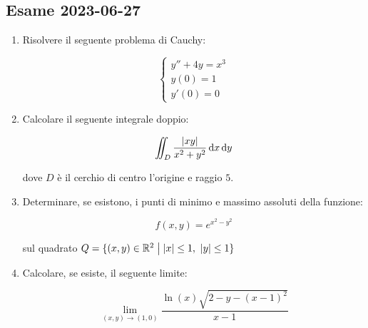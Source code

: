 \subsection{Esame 2023{-}06{-}27}

\begin{enumerate}
    \itemsep32pt
    \item Risolvere il seguente problema di Cauchy:

          \begin{equation*}
              \begin{cases}
                  y'' + 4y = x^3 \\
                  y(0) = 1       \\
                  y'(0) = 0
              \end{cases}
          \end{equation*}

    \item Calcolare il seguente integrale doppio:

          \[
              \iint_{D} \frac{|xy|}{x^2 + y^2} \mathop{}\!\mathrm{d}{x}\mathop{}\!\mathrm{d}{y}
          \]

          dove \(D\) è il cerchio di centro l'origine e raggio \(5\).

    \item Determinare, se esistono, i punti di minimo e massimo assoluti della funzione:

          \[
              f(x,y) = e^{x^2-y^2}
          \]

          sul quadrato \(Q = \{ (x,y) \in \mathbb{R}^2 \;\big|\; |x| \le 1,\ |y| \le 1 \}\)

    \item Calcolare, se esiste, il seguente limite:

          \[
              \lim_{(x,y) \rightarrow (1,0)}
              \frac
              {\ln(x) \sqrt{2-y-{(x-1)}^2}}
              {x-1}
          \]

\end{enumerate}
